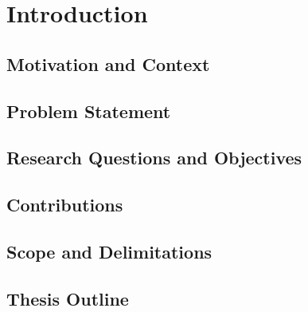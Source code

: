 \chapter{Introduction}
\label{ch:introduction}

\section{Motivation and Context}

\section{Problem Statement}

\section{Research Questions and Objectives}

\section{Contributions}

\section{Scope and Delimitations}

\section{Thesis Outline}

